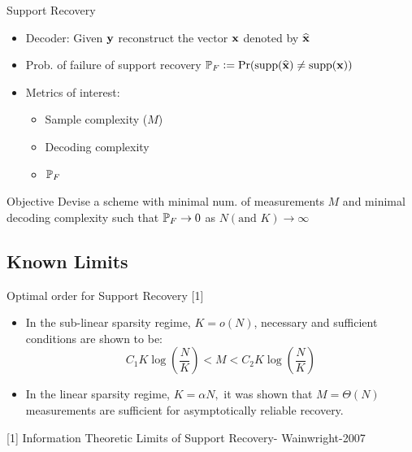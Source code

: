 \documentclass[10pt]{beamer}
\begin{document}
\begin{frame}{Support Recovery}
\begin{itemize}
\item Decoder: Given $\mathbf{y}$ reconstruct the vector $\mathbf{x}$ denoted by $\widehat{\mathbf{x}}$
\item Prob. of failure of support recovery $\mathbb{P}_{F}\mathrel{\mathop:}= \text{Pr}(\text{supp}(\widehat{\mathbf{x}})\neq \text{supp}(\mathbf{x}))$
\item Metrics of interest:
\begin{itemize}
\item Sample complexity ($M$)
\item Decoding complexity
\item $\mathbb{P}_{F}$
\end{itemize} 
\end{itemize}
\vspace{5ex}

\begin{block}{Objective}
Devise a scheme with minimal num. of measurements $M$ and minimal decoding complexity such that $\mathbb{P}_{F}\rightarrow 0$ as $N (\text{and } K) \rightarrow \infty$
\end{block}
\end{frame}

\subsection{Known Limits}
\begin{frame}
\begin{block}{Optimal order for Support Recovery [1]}
\begin{itemize}
\item In the sub-linear sparsity regime, $K=o(N)$, necessary and sufficient conditions are shown to be:
\begin{equation*}
C_1 K\log\left(\frac{N}{K}\right)<M<C_2 K\log\left(\frac{N}{K}\right)
\end{equation*}
\item In the linear sparsity regime, $K=\alpha N,$ it was shown that $M=\Theta(N)$ measurements are sufficient for asymptotically reliable recovery. 
 \end{itemize}
\end{block}
\vspace{7ex}


[1] Information Theoretic Limits of Support Recovery- Wainwright-2007
\end{frame}
\end{document}
